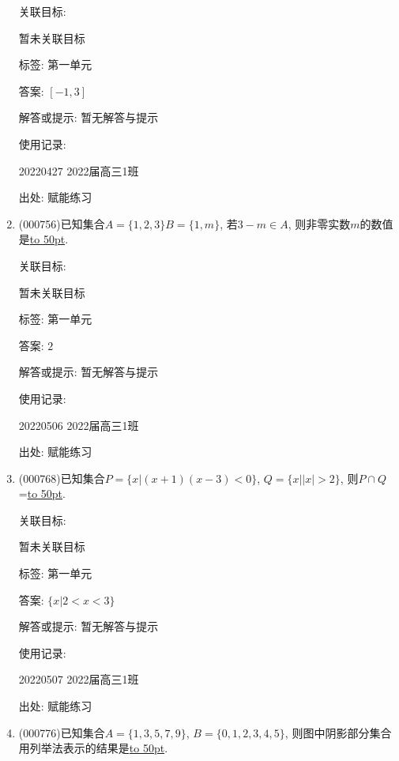 \documentclass[10pt,a4paper]{article}
\newcommand{\blank}[1]{\underline{\hbox to #1pt{}}}
\begin{document}
\begin{enumerate}[1.]
关联目标:

暂未关联目标



标签: 第一单元

答案: $[-1,3]$

解答或提示: 暂无解答与提示

使用记录:

20220427	2022届高三1班	


出处: 赋能练习
\item { (000756)}已知集合$A=\{1,2,3\}B=\{1,m\}$, 若$3-m\in A$, 则非零实数$m$的数值是\blank{50}.


关联目标:

暂未关联目标



标签: 第一单元

答案: $2$

解答或提示: 暂无解答与提示

使用记录:

20220506	2022届高三1班	


出处: 赋能练习
\item { (000768)}已知集合$P=\{x|(x+1)(x-3)<0\}$, $Q=\{x||x|>2\}$, 则$P\cap Q$=\blank{50}.


关联目标:

暂未关联目标



标签: 第一单元

答案: $\{x|2<x<3\}$

解答或提示: 暂无解答与提示

使用记录:

20220507	2022届高三1班	


出处: 赋能练习
\item { (000776)}已知集合$A=\{1,3,5,7,9\}$, $B=\{0,1,2,3,4,5\}$, 则图中阴影部分集合用列举法表示的结果是\blank{50}.
\begin{center}
\end{center}



\end{enumerate}
\end{document}
